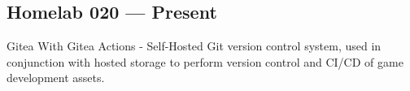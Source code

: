 \subsection{{Homelab \texorpdfstring{\hfill} \texorpdfstring{\null} 2020 --- Present}}
\begin{zitemize}
\item Gitea With Gitea Actions - Self-Hosted Git version control system, used in conjunction with hosted storage to perform version control and CI/CD of game development assets.
\end{zitemize}
